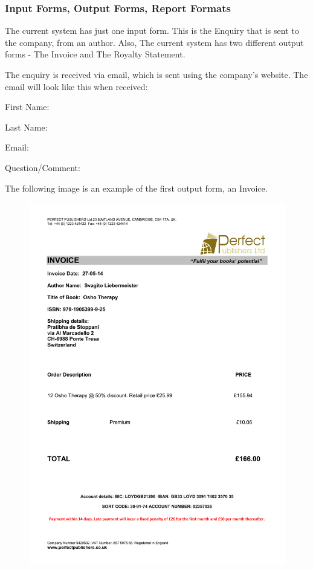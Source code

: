 \subsubsection{Input Forms, Output Forms, Report Formats}

The current system has just one input form. This is the Enquiry that is sent to the company, from an author. Also, The current system has two different output forms - The Invoice and The Royalty Statement.


The enquiry is received via email, which is sent using the company's website. The email will look like this when received:


First Name:

Last Name:

Email:

Question/Comment:



The following image is an example of the first output form, an Invoice.

\begin{figure}[H]
    \includegraphics[width=\textwidth]{./Analysis/Invoice Example.pdf}
\end{figure}


